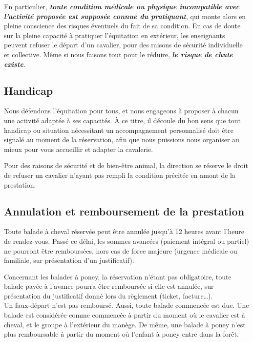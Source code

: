\documentclass[11pt,a4paper]{article}
\renewcommand{\emph}[1]{\textit{\textbf{#1}}}
\begin{document}
      En particulier, \emph{toute condition médicale ou physique incompatible avec l'activité proposée est supposée connue du pratiquant}, qui monte alors en pleine conscience des risques éventuels du fait de sa condition.
      En cas de doute sur la pleine capacité à pratiquer l'équitation en extérieur, les enseignants peuvent refuser le départ d'un cavalier, pour des raisons de sécurité individuelle et collective.
      Même si nous faisons tout pour le réduire, \emph{le risque de chute existe}.

   \subsection*{Handicap}
      Nous défendons l'équitation pour tous, et nous engageons à proposer à chacun une activité adaptée à ses capacités.
      À ce titre, il découle du bon sens que tout handicap ou situation nécessitant un accompagnement personnalisé doit être signalé au moment de la réservation, afin que nous puissions nous organiser au mieux pour vous accueillir et adapter la cavalerie.

      Pour des raisons de sécurité et de bien-être animal, la direction se réserve le droit de refuser un cavalier n'ayant pas rempli la condition précitée en amont de la prestation.

   \subsection*{Annulation et remboursement de la prestation}
      Toute balade à cheval réservée peut être annulée jusqu'à 12 heures avant l'heure de rendez-vous.
      Passé ce délai, les sommes avancées (paiement intégral ou partiel) ne pourront être remboursées, hors cas de force majeure (urgence médicale ou familiale, sur présentation d'un justificatif).

      Concernant les balades à poney, la réservation n'étant pas obligatoire, toute balade payée à l'avance pourra être remboursée si elle est annulée, sur présentation du justificatif donné lors du règlement (ticket, facture\dots).
      \\

      Un faux-départ n'est pas remboursé.
      Aussi, toute balade commencée est due.
      Une balade est considérée comme \og commencée \fg{} à partir du moment où le cavalier est à cheval, et le groupe à l'extérieur du manège.
      De même, une balade à poney n'est plus remboursable à partir du moment où l'enfant à poney entre dans la forêt.
\end{document}
